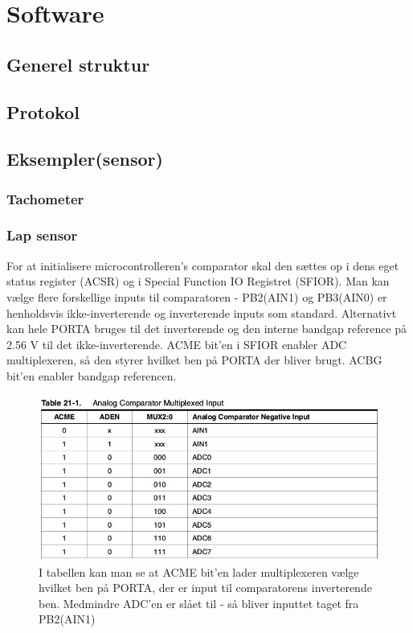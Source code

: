 \section{Software}

\subsection{Generel struktur}

\subsection{Protokol}

\subsection{Eksempler(sensor)}

\subsubsection{Tachometer}

\subsubsection{Lap sensor}

For at initialisere microcontrolleren's comparator skal den sættes op i dens eget status register (ACSR) og i Special Function IO Registret (SFIOR). Man kan vælge flere forskellige inputs til comparatoren - PB2(AIN1) og PB3(AIN0) er henholdsvis ikke-inverterende og inverterende inputs som standard. Alternativt kan hele PORTA bruges til det inverterende og den interne bandgap reference på 2.56 V til det ikke-inverterende.  ACME bit'en i SFIOR enabler ADC multiplexeren, så den styrer hvilket ben på PORTA der bliver brugt. ACBG bit'en enabler bandgap referencen.

\begin{figure}[h]

	\centering
		\includegraphics[scale=0.3]{Billeder/Table21-1.jpg}
	\caption{I tabellen kan man se at ACME bit'en lader multiplexeren vælge hvilket ben på PORTA, der er input til comparatorens inverterende ben. Medmindre ADC'en er slået til - så bliver inputtet taget fra PB2(AIN1)}
	\label{fig:ACME}
	
\end{figure}


